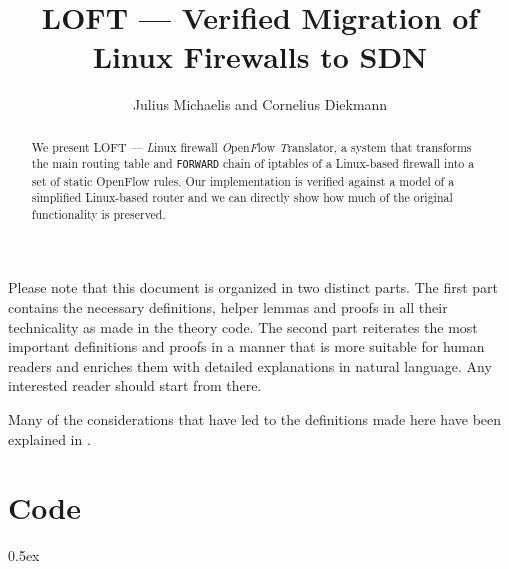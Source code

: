 \documentclass[a4paper]{article}
\begin{document}
\title{LOFT — Verified Migration of Linux Firewalls to SDN}
\author{Julius Michaelis and Cornelius Diekmann}
\maketitle

\begin{abstract}
	We present LOFT — \emph{L}inux firewall \emph{O}pen\emph{F}low \emph{T}ranslator, a system that transforms the main routing table and \texttt{FORWARD} chain of iptables of a Linux-based firewall into a set of static OpenFlow rules.
	Our implementation is verified against a model of a simplified Linux-based router and we can directly show how much of the original functionality is preserved.
\end{abstract}
\vspace{1em}

Please note that this document is organized in two distinct parts.
The first part contains the necessary definitions, helper lemmas and proofs in all their technicality as made in the theory code.
The second part reiterates the most important definitions and proofs in a manner that is more suitable for human readers and enriches them with detailed explanations in natural language.
Any interested reader should start from there.

Many of the considerations that have led to the definitions made here have been explained in \cite{michaelis2016middlebox}.

\tableofcontents

\newpage

\part{Code}

\parindent 0pt\parskip 0.5ex








%
%
\end{document}
